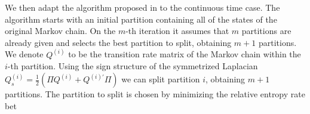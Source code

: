 We then adapt the algorithm proposed in  to the continuous time case. The algorithm starts with an initial partition containing all of the states of the original Markov chain. On the $m$-th iteration it assumes that $m$ partitions are already given and selects the best partition to split, obtaining $m+1$ partitions. We denote $Q^{(i)}$ to be the transition rate matrix of the Markov chain within the $i$-th partition. Using the sign structure of the symmetrized Laplacian $Q_s^{(i)} = \frac{1}{2}(\Pi Q^{(i)} + Q^{(i)'} \Pi)$ we can split partition $i$, obtaining $m+1$ partitions. The partition to split is chosen by minimizing the relative entropy rate bet

